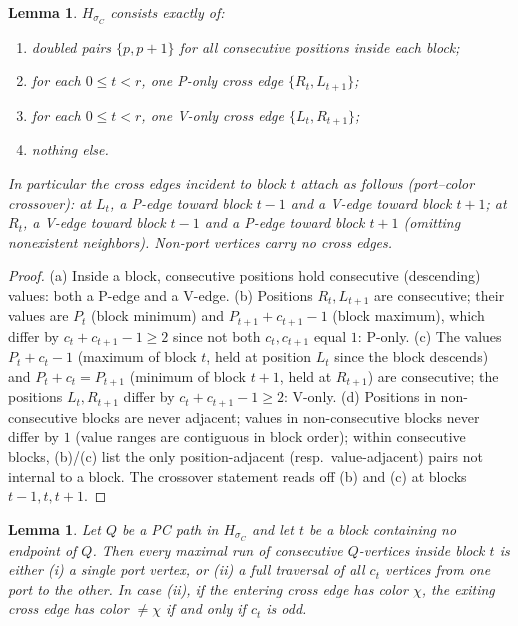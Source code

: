 \documentclass[11pt]{article}
\newtheorem{lemma}[theorem]{Lemma}
\theoremstyle{definition}
\begin{document}
\begin{lemma}\label{lem:chain-inv}
$H_{\sigma_C}$ consists exactly of:
\begin{enumerate}
\item[(a)] doubled pairs $\{p, p+1\}$ for all consecutive positions inside each block;
\item[(b)] for each $0 \le t < r$, one P-only cross edge $\{R_t, L_{t+1}\}$;
\item[(c)] for each $0 \le t < r$, one V-only cross edge $\{L_t, R_{t+1}\}$;
\item[(d)] nothing else.
\end{enumerate}
In particular the cross edges incident to block $t$ attach as follows
(\emph{port--color crossover}): at $L_t$, a P-edge toward block $t-1$ and a V-edge
toward block $t+1$; at $R_t$, a V-edge toward block $t-1$ and a P-edge toward block
$t+1$ (omitting nonexistent neighbors). Non-port vertices carry no cross edges.
\end{lemma}

\begin{proof}
(a) Inside a block, consecutive positions hold consecutive (descending) values: both a
P-edge and a V-edge. (b) Positions $R_t, L_{t+1}$ are consecutive; their values are
$P_t$ (block minimum) and $P_{t+1} + c_{t+1} - 1$ (block maximum), which differ by
$c_t + c_{t+1} - 1 \ge 2$ since not both $c_t, c_{t+1}$ equal $1$: P-only. (c) The
values $P_t + c_t - 1$ (maximum of block $t$, held at position $L_t$ since the block
descends) and $P_t + c_t = P_{t+1}$ (minimum of block $t+1$, held at $R_{t+1}$) are
consecutive; the positions $L_t, R_{t+1}$ differ by $c_t + c_{t+1} - 1 \ge 2$: V-only.
(d) Positions in non-consecutive blocks are never adjacent; values in non-consecutive
blocks never differ by $1$ (value ranges are contiguous in block order); within
consecutive blocks, (b)/(c) list the only position-adjacent (resp.\ value-adjacent)
pairs not internal to a block. The crossover statement reads off (b) and (c) at blocks
$t-1, t, t+1$.
\end{proof}

\begin{lemma}\label{lem:chain-visit}
Let $Q$ be a PC path in $H_{\sigma_C}$ and let $t$ be a block containing no endpoint of
$Q$. Then every maximal run of consecutive $Q$-vertices inside block $t$ is either
(i) a single port vertex, or (ii) a \emph{full traversal} of all $c_t$ vertices from
one port to the other. In case (ii), if the entering cross edge has color $\chi$, the
exiting cross edge has color $\ne \chi$ if and only if $c_t$ is odd.
\end{lemma}
\end{document}
